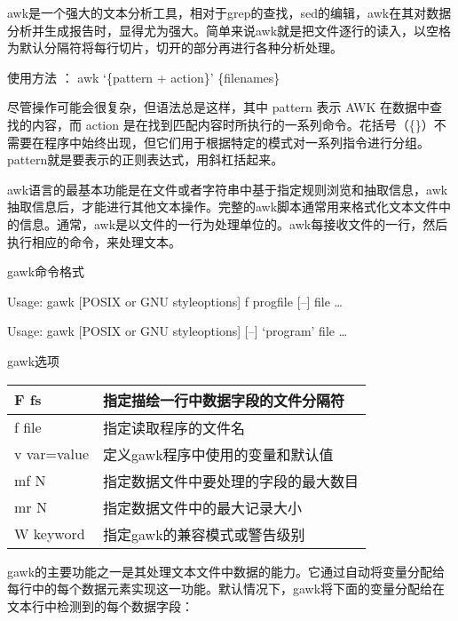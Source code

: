 \documentclass[letterpaper,12pt,english]{sphinxmanual}
\begin{document}


awk是一个强大的文本分析工具，相对于grep的查找，sed的编辑，awk在其对数据分析并生成报告时，显得尤为强大。简单来说awk就是把文件逐行的读入，以空格为默认分隔符将每行切片，切开的部分再进行各种分析处理。

使用方法   ： awk ‘\{pattern + action\}’ \{filenames\}

尽管操作可能会很复杂，但语法总是这样，其中 pattern 表示 AWK 在数据中查找的内容，而 action 是在找到匹配内容时所执行的一系列命令。花括号（\{\}）不需要在程序中始终出现，但它们用于根据特定的模式对一系列指令进行分组。 pattern就是要表示的正则表达式，用斜杠括起来。

awk语言的最基本功能是在文件或者字符串中基于指定规则浏览和抽取信息，awk抽取信息后，才能进行其他文本操作。完整的awk脚本通常用来格式化文本文件中的信息。通常，awk是以文件的一行为处理单位的。awk每接收文件的一行，然后执行相应的命令，来处理文本。

gawk命令格式

Usage: gawk {[}POSIX or GNU styleoptions{]} \sphinxhyphen{}f progfile {[}–{]} file …

Usage: gawk {[}POSIX or GNU styleoptions{]} {[}–{]} ‘program’ file …

gawk选项


\begin{savenotes}\sphinxattablestart
\centering
\begin{tabulary}{\linewidth}[t]{|T|T|}
\hline
\sphinxstyletheadfamily 
\sphinxhyphen{}F fs
&\sphinxstyletheadfamily 
指定描绘一行中数据字段的文件分隔符
\\
\hline
\sphinxhyphen{}f file
&
指定读取程序的文件名
\\
\hline
\sphinxhyphen{}v var=value
&
定义gawk程序中使用的变量和默认值
\\
\hline
\sphinxhyphen{}mf N
&
指定数据文件中要处理的字段的最大数目
\\
\hline
\sphinxhyphen{}mr N
&
指定数据文件中的最大记录大小
\\
\hline
\sphinxhyphen{}W keyword
&
指定gawk的兼容模式或警告级别
\\
\hline
\end{tabulary}
\par
\sphinxattableend\end{savenotes}

gawk的主要功能之一是其处理文本文件中数据的能力。它通过自动将变量分配给每行中的每个数据元素实现这一功能。默认情况下，gawk将下面的变量分配给在文本行中检测到的每个数据字段：
\end{document}
